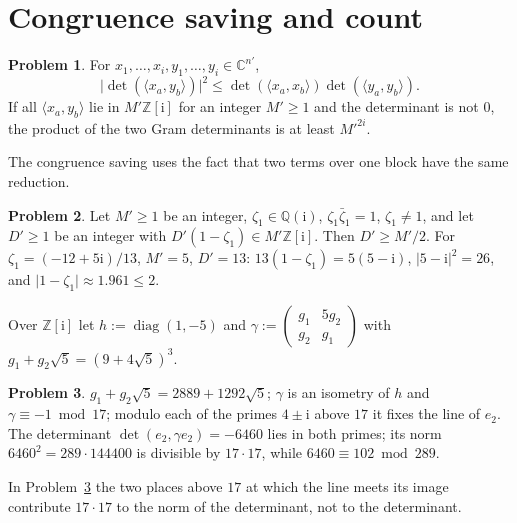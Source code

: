 \documentclass[reqno]{amsart}
\theoremstyle{definition}
\newtheorem{problem}{Problem}[section]
\theoremstyle{plain}
\theoremstyle{remark}
\newcommand{\Z}{{\mathbb{Z}}}
\newcommand{\C}{{\mathbb{C}}}
\newcommand{\ii}{\mathrm{i}}
\newcommand{\diag}{\operatorname{diag}}
\begin{document}
\section{Congruence saving and count}\label{sec:gain}

\begin{problem}\label{pr:det-cs}
For \(x_1,\dots,x_i,y_1,\dots,y_i\in\C^{n'}\),
\[
 \lvert\det(\langle x_a,y_b\rangle)\rvert^2\le\det(\langle x_a,x_b\rangle)\det(\langle y_a,y_b\rangle).
\]
If all \(\langle x_a,y_b\rangle\) lie in \(M'\Z[\ii]\) for an integer \(M'\ge1\) and the determinant is not \(0\), the product of the two Gram determinants is at least \(M'^{2i}\).
\end{problem}

The congruence saving uses the fact that two terms over one block have the same reduction.

\begin{problem}\label{pr:congruence}
Let \(M'\ge1\) be an integer, \(\zeta_1\in\mathbb Q(\ii)\), \(\zeta_1\bar\zeta_1=1\), \(\zeta_1\ne1\), and let \(D'\ge1\) be an integer with \(D'(1-\zeta_1)\in M'\Z[\ii]\).  Then \(D'\ge M'/2\).  For \(\zeta_1=(-12+5\ii)/13\), \(M'=5\), \(D'=13\): \(13(1-\zeta_1)=5(5-\ii)\), \(\lvert5-\ii\rvert^2=26\), and \(\lvert1-\zeta_1\rvert\approx1.961\le2\).
\end{problem}

Over \(\Z[\ii]\) let \(h:=\diag(1,-5)\) and \(\gamma:=\left(\begin{smallmatrix}g_1&5g_2\\g_2&g_1\end{smallmatrix}\right)\) with \(g_1+g_2\sqrt5=(9+4\sqrt5)^3\).

\begin{problem}\label{pr:meet}
\(g_1+g_2\sqrt5=2889+1292\sqrt5\); \(\gamma\) is an isometry of \(h\) and \(\gamma\equiv-1\bmod17\); modulo each of the primes \(4\pm\ii\) above \(17\) it fixes the line of \(e_2\).  The determinant \(\det(e_2,\gamma e_2)=-6460\) lies in both primes; its norm \(6460^2=289\cdot144400\) is divisible by \(17\cdot17\), while \(6460\equiv102\bmod289\).
\end{problem}

In Problem~\ref{pr:meet} the two places above \(17\) at which the line meets its image contribute \(17\cdot17\) to the norm of the determinant, not to the determinant.
\end{document}
